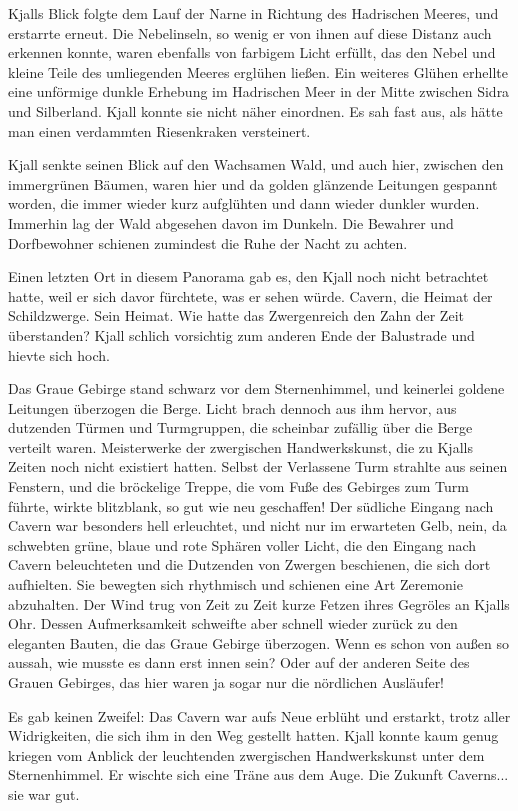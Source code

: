 \documentclass[10pt, a4paper, oneside]{book}
\begin{document}
Kjalls Blick folgte dem Lauf der Narne in Richtung des Hadrischen Meeres, und erstarrte erneut. Die Nebelinseln, so wenig er von ihnen auf diese Distanz auch erkennen konnte, waren ebenfalls von farbigem Licht erfüllt, das den Nebel und kleine Teile des umliegenden Meeres erglühen ließen. Ein weiteres Glühen erhellte eine unförmige dunkle Erhebung im Hadrischen Meer in der Mitte zwischen Sidra und Silberland. Kjall konnte sie nicht näher einordnen. Es sah fast aus, als hätte man einen verdammten Riesenkraken versteinert.

Kjall senkte seinen Blick auf den Wachsamen Wald, und auch hier, zwischen den immergrünen Bäumen, waren hier und da golden glänzende Leitungen gespannt worden, die immer wieder kurz aufglühten und dann wieder dunkler wurden. Immerhin lag der Wald abgesehen davon im Dunkeln. Die Bewahrer und Dorfbewohner schienen zumindest die Ruhe der Nacht zu achten.

Einen letzten Ort in diesem Panorama gab es, den Kjall noch nicht betrachtet hatte, weil er sich davor fürchtete, was er sehen würde. Cavern, die Heimat der Schildzwerge. Sein Heimat. Wie hatte das Zwergenreich den Zahn der Zeit überstanden? Kjall schlich vorsichtig zum anderen Ende der Balustrade und hievte sich hoch.

Das Graue Gebirge stand schwarz vor dem Sternenhimmel, und keinerlei goldene Leitungen überzogen die Berge. Licht brach dennoch aus ihm hervor, aus dutzenden Türmen und Turmgruppen, die scheinbar zufällig über die Berge verteilt waren. Meisterwerke der zwergischen Handwerkskunst, die zu Kjalls Zeiten noch nicht existiert hatten. Selbst der Verlassene Turm strahlte aus seinen Fenstern, und die bröckelige Treppe, die vom Fuße des Gebirges zum Turm führte, wirkte blitzblank, so gut wie neu geschaffen! Der südliche Eingang nach Cavern war besonders hell erleuchtet, und nicht nur im erwarteten Gelb, nein, da schwebten grüne, blaue und rote Sphären voller Licht, die den Eingang nach Cavern beleuchteten und die Dutzenden von Zwergen beschienen, die sich dort aufhielten. Sie bewegten sich rhythmisch und schienen eine Art Zeremonie abzuhalten. Der Wind trug von Zeit zu Zeit kurze Fetzen ihres Gegröles an Kjalls Ohr. Dessen Aufmerksamkeit schweifte aber schnell wieder zurück zu den eleganten Bauten, die das Graue Gebirge überzogen. Wenn es schon von außen so aussah, wie musste es dann erst innen sein? Oder auf der anderen Seite des Grauen Gebirges, das hier waren ja sogar nur die nördlichen Ausläufer!

Es gab keinen Zweifel: Das Cavern war aufs Neue erblüht und erstarkt, trotz aller Widrigkeiten, die sich ihm in den Weg gestellt hatten. Kjall konnte kaum genug kriegen vom Anblick der leuchtenden zwergischen Handwerkskunst unter dem Sternenhimmel. Er wischte sich eine Träne aus dem Auge. Die Zukunft Caverns... sie war gut.
\end{document}
